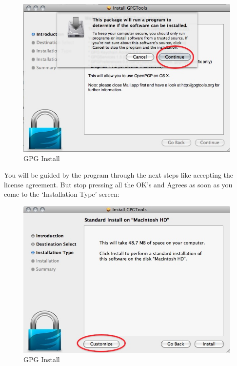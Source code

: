 \begin{figure}[htbp]
\centering
\includegraphics{gpg_mac_inst_5.jpg}
\caption{GPG Install}
\end{figure}

You will be guided by the program through the next steps like accepting
the license agreement. But stop pressing all the OK's and Agrees as soon
as you come to the `Installation Type' screen:

\begin{figure}[htbp]
\centering
\includegraphics{gpg_mac_inst_6.jpg}
\caption{GPG Install}
\end{figure}

